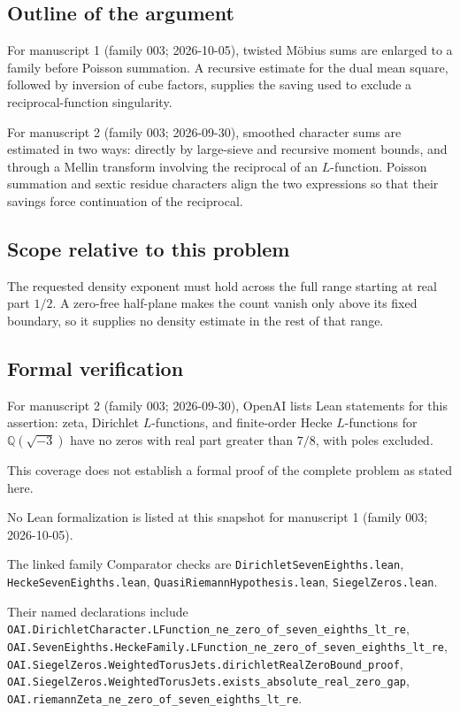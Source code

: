 \documentclass[11pt]{article}
\begin{document}
\subsection{Outline of the argument}
For manuscript 1 (family 003; 2026-10-05), twisted M\"obius sums are enlarged to a family before Poisson summation. A recursive estimate for the dual mean square, followed by inversion of cube factors, supplies the saving used to exclude a reciprocal-function singularity.

For manuscript 2 (family 003; 2026-09-30), smoothed character sums are estimated in two ways: directly by large-sieve and recursive moment bounds, and through a Mellin transform involving the reciprocal of an $L$-function. Poisson summation and sextic residue characters align the two expressions so that their savings force continuation of the reciprocal.

\subsection{Scope relative to this problem}
The requested density exponent must hold across the full range starting at real part $1/2$. A zero-free half-plane makes the count vanish only above its fixed boundary, so it supplies no density estimate in the rest of that range.

\subsection{Formal verification}
For manuscript 2 (family 003; 2026-09-30), OpenAI lists Lean statements for this assertion: zeta, Dirichlet $L$-functions, and finite-order Hecke $L$-functions for $\mathbb Q(\sqrt{-3})$ have no zeros with real part greater than $7/8$, with poles excluded.

This coverage does not establish a formal proof of the complete problem as stated here.

No Lean formalization is listed at this snapshot for manuscript 1 (family 003; 2026-10-05).

The linked family Comparator checks are \texttt{DirichletSevenEighths.lean}, \texttt{HeckeSevenEighths.lean}, \texttt{QuasiRiemannHypothesis.lean}, \texttt{SiegelZeros.lean}.

Their named declarations include \texttt{OAI.DirichletCharacter.LFunction\_ne\_zero\_of\_seven\_eighths\_lt\_re}, \texttt{OAI.SevenEighths.HeckeFamily.LFunction\_ne\_zero\_of\_seven\_eighths\_lt\_re}, \texttt{OAI.SiegelZeros.WeightedTorusJets.dirichletRealZeroBound\_proof}, \texttt{OAI.SiegelZeros.WeightedTorusJets.exists\_absolute\_real\_zero\_gap}, \texttt{OAI.riemannZeta\_ne\_zero\_of\_seven\_eighths\_lt\_re}.
\end{document}
